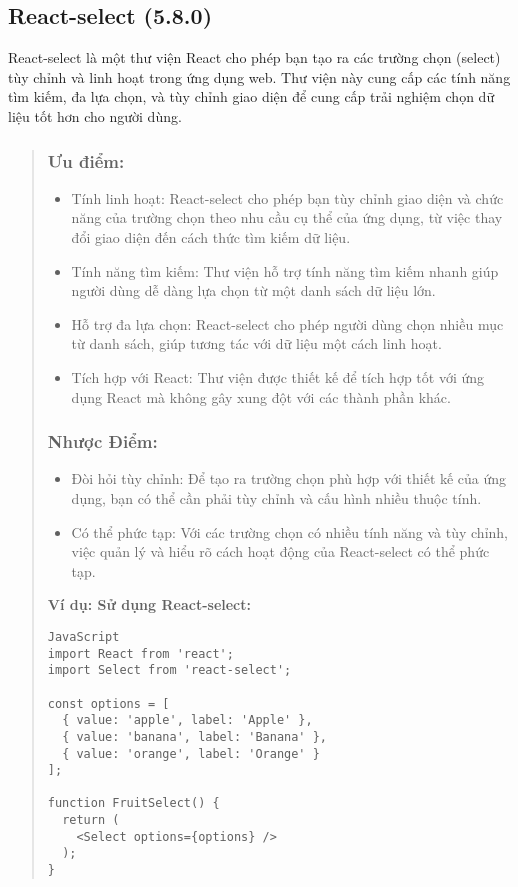 \subsection{React-select (5.8.0)}

React-select là một thư viện React cho phép bạn tạo ra các trường chọn (select) tùy chỉnh và linh hoạt trong ứng dụng web. Thư viện này cung cấp các tính năng tìm kiếm, đa lựa chọn, và tùy chỉnh giao diện để cung cấp trải nghiệm chọn dữ liệu tốt hơn cho người dùng.

\begin{quote}
\subsubsection{Ưu điểm:}
\begin{itemize}
  \item Tính linh hoạt: React-select cho phép bạn tùy chỉnh giao diện và chức năng của trường chọn theo nhu cầu cụ thể của ứng dụng, từ việc thay đổi giao diện đến cách thức tìm kiếm dữ liệu.
  \item Tính năng tìm kiếm: Thư viện hỗ trợ tính năng tìm kiếm nhanh giúp người dùng dễ dàng lựa chọn từ một danh sách dữ liệu lớn.
  \item Hỗ trợ đa lựa chọn: React-select cho phép người dùng chọn nhiều mục từ danh sách, giúp tương tác với dữ liệu một cách linh hoạt.
  \item Tích hợp với React: Thư viện được thiết kế để tích hợp tốt với ứng dụng React mà không gây xung đột với các thành phần khác.
\end{itemize}

\subsubsection{Nhược Điểm:}
\begin{itemize}
  \item Đòi hỏi tùy chỉnh: Để tạo ra trường chọn phù hợp với thiết kế của ứng dụng, bạn có thể cần phải tùy chỉnh và cấu hình nhiều thuộc tính.
  \item Có thể phức tạp: Với các trường chọn có nhiều tính năng và tùy chỉnh, việc quản lý và hiểu rõ cách hoạt động của React-select có thể phức tạp.
\end{itemize}

\textbf{Ví dụ: Sử dụng React-select:}
\begin{lstlisting}
JavaScript
import React from 'react';
import Select from 'react-select';

const options = [
  { value: 'apple', label: 'Apple' },
  { value: 'banana', label: 'Banana' },
  { value: 'orange', label: 'Orange' }
];

function FruitSelect() {
  return (
    <Select options={options} />
  );
}
\end{lstlisting}
\end{quote}


